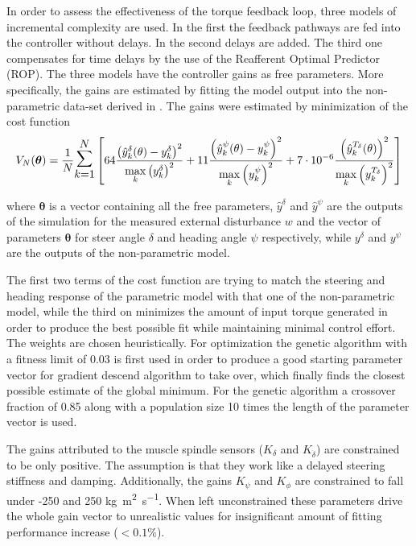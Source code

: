 In order to assess the effectiveness of the torque feedback loop, three models of incremental complexity are used. In the first the feedback pathways are fed into the controller without delays. In the second delays are added. The third one compensates for time delays by the use of the Reafferent Optimal Predictor (ROP). The three models have the  controller gains as free parameters. More specifically, the gains are estimated by fitting the model output into the non-parametric data-set derived in \cite{dialynaseffect}.  The gains were estimated by minimization of the cost function 
\begin{equation}
    V_{N}(\boldsymbol{\theta})=\frac{1}{N} \mathlarger{\mathlarger{\mathlarger{\sum}}}_{k=1}^{N}\left[64\frac{\left(\hat{y}^{\delta}_k(\mathbf{\theta})-y^\delta_k\right)^{2}}{\underset{k}{\max} \left(y^\delta_k\right)^2}+11\frac{\left(\hat{y}^{\psi}_k(\mathbf{\theta})-y^\psi_k\right)^{2}}{\underset{k}{\max} \left(y^\psi_k\right)^2}+7\cdot10^{-6}\frac{\left(\hat{y}^{T_\delta}_k(\mathbf{\theta})\right)^2}{\underset{k}{\max} \left(y^{T_\delta}_k\right)^2}\right]
    \label{eq:cost}
    \end{equation}

where \ensuremath{\boldsymbol{\theta}} is a vector containing all the free parameters, \ensuremath{\hat{y}^{\delta}} and \ensuremath{\hat{y}^{\psi}} are the outputs of the simulation for the measured external disturbance \ensuremath{w} and the vector of parameters  \ensuremath{\boldsymbol{\theta}} for steer angle \ensuremath{\delta} and heading angle \ensuremath{\psi}  respectively, while \ensuremath{y^\delta} and \ensuremath{y^\psi} are the outputs of the non-parametric model.

The first two terms  of the cost function are trying to match the steering and heading  response of the parametric model with that one of the non-parametric model, while the third on minimizes the amount of input torque generated in order to produce the best possible fit while maintaining minimal control effort. The weights are chosen heuristically. For optimization the genetic algorithm with a fitness limit of 0.03 is first  used in order to produce a good starting parameter vector for gradient descend algorithm to take over, which finally finds the closest possible estimate of the global minimum. For the genetic algorithm a crossover fraction of 0.85  along with a population size 10 times the length of the parameter vector is used.

The gains attributed to the muscle spindle sensors (\ensuremath{K_\delta} and \ensuremath{K_{\dot{\delta}}}) are constrained to be only positive. The assumption is that they work like a delayed steering stiffness and damping. Additionally, the gains \ensuremath{K_\psi} and \ensuremath{K_\phi}  are constrained to fall under -250 and 250 \si{\kilogram\square\meter\per\second}.  When left unconstrained these parameters drive the whole gain vector to unrealistic values for insignificant amount of fitting performance increase (\ensuremath{<0.1\%}).

